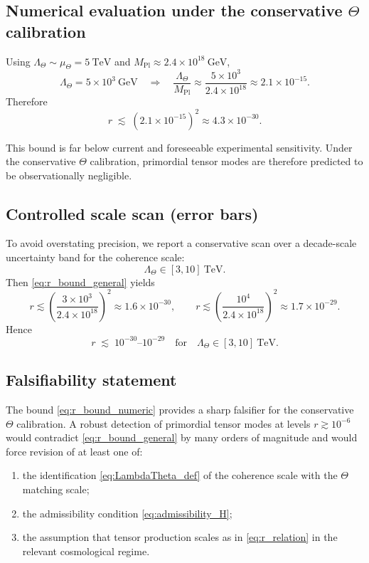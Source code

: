 \documentclass[11pt]{article}
\begin{document}
\subsection{Numerical evaluation under the conservative $\Theta$ calibration}

Using $\Lambda_\Theta \sim \mu_\Theta = 5~\mathrm{TeV}$ and
$M_{\mathrm{Pl}}\approx 2.4\times 10^{18}~\mathrm{GeV}$,
\[
\Lambda_\Theta = 5\times 10^3~\mathrm{GeV}
\quad\Rightarrow\quad
\frac{\Lambda_\Theta}{M_{\mathrm{Pl}}}
\approx
\frac{5\times 10^3}{2.4\times 10^{18}}
\approx
2.1\times 10^{-15}.
\]
Therefore
\begin{equation}
\boxed{
r \;\lesssim\; \left(2.1\times 10^{-15}\right)^2
\approx 4.3\times 10^{-30}.
}
\label{eq:r_bound_numeric}
\end{equation}

\begin{remark}
This bound is far below current and foreseeable experimental sensitivity. Under
the conservative $\Theta$ calibration, primordial tensor modes are therefore
predicted to be observationally negligible.
\end{remark}

\subsection{Controlled scale scan (error bars)}

To avoid overstating precision, we report a conservative scan over a decade-scale
uncertainty band for the coherence scale:
\[
\Lambda_\Theta \in [3,10]~\mathrm{TeV}.
\]
Then \eqref{eq:r_bound_general} yields
\[
r \lesssim \left(\frac{3\times 10^3}{2.4\times 10^{18}}\right)^2
\approx 1.6\times 10^{-30},
\qquad
r \lesssim \left(\frac{10^4}{2.4\times 10^{18}}\right)^2
\approx 1.7\times 10^{-29}.
\]
Hence
\begin{equation}
\boxed{
r \;\lesssim\; 10^{-30}\text{--}10^{-29}
\quad\text{for}\quad
\Lambda_\Theta \in [3,10]~\mathrm{TeV}.
}
\label{eq:r_bound_scan}
\end{equation}

\subsection{Falsifiability statement}

The bound \eqref{eq:r_bound_numeric} provides a sharp falsifier for the
conservative $\Theta$ calibration.
A robust detection of primordial tensor modes at levels
$r\gtrsim 10^{-6}$ would contradict \eqref{eq:r_bound_general} by many orders of
magnitude and would force revision of at least one of:
\begin{enumerate}
\item the identification \eqref{eq:LambdaTheta_def} of the coherence scale with
the $\Theta$ matching scale;
\item the admissibility condition \eqref{eq:admissibility_H};
\item the assumption that tensor production scales as in \eqref{eq:r_relation}
in the relevant cosmological regime.
\end{enumerate}
\end{document}
